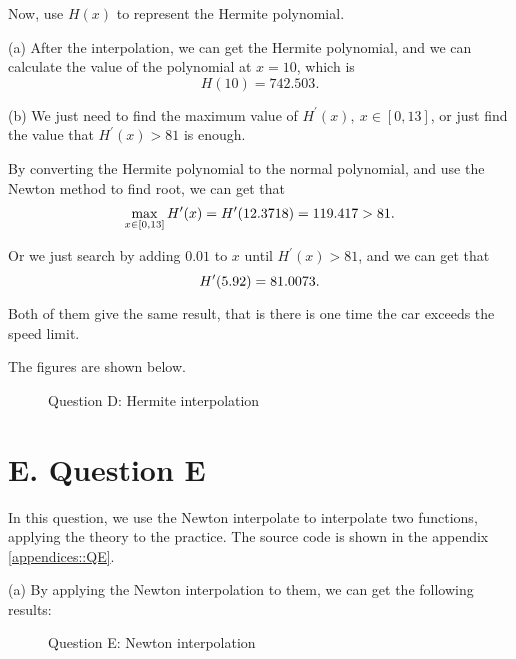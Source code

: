 \documentclass[a4paper]{article}
\begin{document}
Now, use $H(x)$ to represent the Hermite polynomial.

(a) After the interpolation, we can get the Hermite polynomial, and we can calculate the value of the polynomial at $x=10$, which is
\begin{equation}
	H(10) = 742.503.
\end{equation}

(b) We just need to find the maximum value of $H^{\prime}(x),~x\in[0,13]$, or just find the value that $H^{\prime}(x) > 81$ is enough. 

By converting the Hermite polynomial to the normal polynomial, and use the Newton method to find root, we can get that
\begin{equation}
	\max_{x\in[0,13]} H^{\prime}(x) = H^{\prime}(12.3718) = 119.417 > 81. \\
\end{equation}

Or we just search by adding $0.01$ to $x$ until $H^{\prime}(x) > 81$, and we can get that
\begin{equation}
	H^{\prime}(5.92) = 81.0073.\\
\end{equation}

Both of them give the same result, that is there is one time the car exceeds the speed limit. 

The figures are shown below.
\begin{figure}[ht]
	\centering
	\caption{Question D: Hermite interpolation}
	\label{fig::questionD}
\end{figure}

\section*{E. Question E}

In this question, we use the Newton interpolate to interpolate two functions, applying the theory to the practice. The source code is shown in the appendix \ref{appendices::QE}. 

(a) By applying the Newton interpolation to them, we can get the following results:
\begin{figure}
	\centering
	\caption{Question E: Newton interpolation}
	\label{fig::questionE}
\end{figure}
\end{document}
